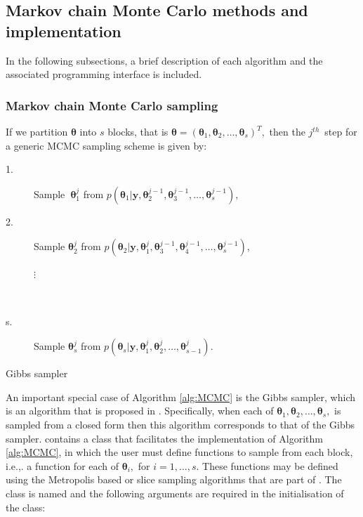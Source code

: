 \documentclass[article]{jss}
\begin{document}
\subsection{Markov chain Monte Carlo methods and implementation}

In the following subsections, a brief description of each algorithm
and the associated programming interface is included.


\subsubsection{Markov chain Monte Carlo sampling}

If we partition $\bm{\theta}$ into $s$ blocks, that is
$\bm{\bm{\theta}}=\left(\bm{\theta}_{1},\bm{\theta}_{2},\ldots,\bm{\theta}_{s}\right)^{T},$
then the $j^{th}$\ step for a generic MCMC sampling scheme is given
by:

%
\begin{algorithm}[H]
\begin{description}
\item [{\textmd{1.}}] Sample\textbf{\ }$\bm{\theta}_{1}^{j}$ from $p\left(\bm{\theta}_{1}|\bm{y,}\bm{\theta}_{2}^{j-1},\bm{\theta}_{3}^{j-1},\ldots,\bm{\theta}_{s}^{j-1}\right),$ 
\item [{\textmd{2.}}] Sample $\bm{\theta}_{2}^{j}$ from $p\left(\bm{\theta}_{2}|\bm{y,}\bm{\theta}_{1}^{j},\bm{\theta}_{3}^{j-1},\bm{\theta}_{4}^{j-1},\ldots,\bm{\theta}_{s}^{j-1}\right),$

\begin{description}
\item [{$\vdots$}]~
\end{description}
\item [{\textmd{s.}}] Sample $\bm{\theta}_{s}^{j}$ from $p\left(\bm{\theta}_{s}|\bm{y,}\bm{\theta}_{1}^{j},\bm{\theta}_{2}^{j},\ldots,\bm{\theta}_{s-1}^{j}\right).$ 
\end{description}
\caption{Gibbs sampler}
\label{alg:MCMC}
\end{algorithm}

An important special case of Algorithm \ref{alg:MCMC} is the Gibbs
sampler, which is an algorithm that is proposed in
\citet{GelfandSmith1990}. Specifically, when each of
$\bm{\theta}_{1},\bm{\theta}_{2},\dots,\bm{\theta}_{s},$ is sampled
from a closed form then this algorithm corresponds to that of the
Gibbs sampler.  contains a class that facilitates the
implementation of Algorithm \ref{alg:MCMC}, in which the user must
define functions to sample from each block, i.e.,. a function for each of
$\bm{\theta}_{i},$ for $i=1,\dots,s.$ These functions may be defined
using the Metropolis based or slice sampling algorithms that are part
of . The class is named  and the following
arguments are required in the initialisation of the class:
\end{document}
